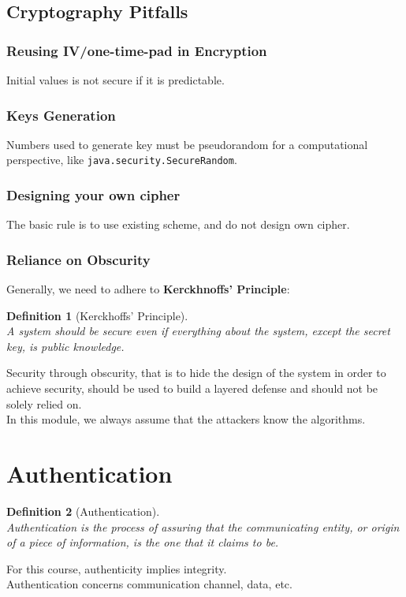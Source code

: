 \documentclass[12pt]{article}
\newtheorem{definition}{Definition}[section]
\theoremstyle{definition}
\begin{document}
\subsection{Cryptography Pitfalls}
\subsubsection{Reusing IV/one-time-pad in Encryption}
Initial values is not secure if it is predictable.
\subsubsection{Keys Generation}
Numbers used to generate key must be pseudorandom for a computational perspective, like \texttt{java.security.SecureRandom}.
\subsubsection{Designing your own cipher}
The basic rule is to use existing scheme, and do not design own cipher.
\subsubsection{Reliance on Obscurity}
Generally, we need to adhere to \textbf{Kerckhnoffs' Principle}:
\begin{definition}[Kerckhoffs' Principle]
\hfill\\\normalfont A system should be secure even if everything about the system, except the secret key, is public knowledge.
\end{definition}
Security through obscurity, that is to hide the design of the system in order to achieve security, should be used to build a layered defense and should not be solely relied on.\\
In this module, we always assume that the attackers know the algorithms.
\clearpage
\section{Authentication}
\begin{definition}[Authentication]
\hfill\\\normalfont Authentication is the process of assuring that the communicating entity, or origin of a piece of information, is the one that it claims to be.
\end{definition}
For this course, authenticity implies integrity.\\
Authentication concerns communication channel, data, etc.
\end{document}
